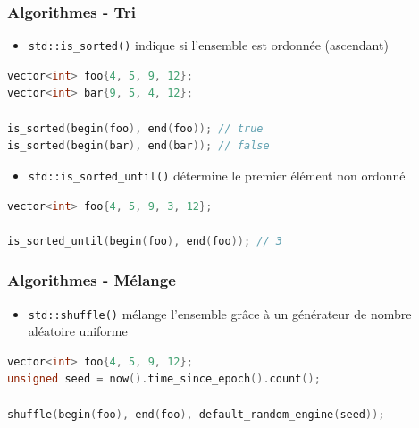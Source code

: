 \documentclass[C++.tex]{subfiles}
\begin{document}
\begin{frame}[fragile]
	\frametitle{Algorithmes - Tri}
	\begin{itemize}
		\item \lstinline|std::is_sorted()| indique si l'ensemble est ordonnée (ascendant)
	\end{itemize}


	\begin{lstlisting}[language=C++]
vector<int> foo{4, 5, 9, 12};
vector<int> bar{9, 5, 4, 12};

is_sorted(begin(foo), end(foo)); // true
is_sorted(begin(bar), end(bar)); // false\end{lstlisting}

	\begin{itemize}
		\item \lstinline|std::is_sorted_until()| détermine le premier élément non ordonné
	\end{itemize}

	\begin{lstlisting}[language=C++]
vector<int> foo{4, 5, 9, 3, 12};

is_sorted_until(begin(foo), end(foo)); // 3\end{lstlisting}
\end{frame}

\begin{frame}[fragile]
	\frametitle{Algorithmes - Mélange}
	\begin{itemize}
		\item \lstinline|std::shuffle()| mélange l'ensemble grâce à un générateur de nombre aléatoire \og uniforme\fg{}
	\end{itemize}

	\begin{lstlisting}[language=C++]
vector<int> foo{4, 5, 9, 12};
unsigned seed = now().time_since_epoch().count();

shuffle(begin(foo), end(foo), default_random_engine(seed));\end{lstlisting}

\end{frame}
\end{document}
